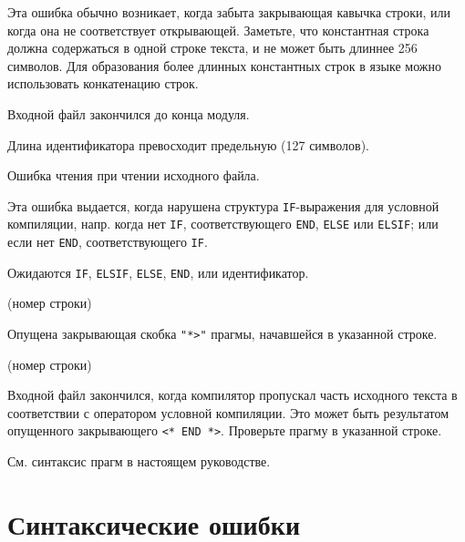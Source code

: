 
Эта ошибка обычно возникает, когда забыта закрывающая кавычка строки,
или когда она не соответствует открывающей. Заметьте, что 
константная строка должна содержаться в одной строке текста, и
не может быть длиннее 256 символов.
Для образования более длинных константных строк в языке \mt{} можно 
использовать конкатенацию строк.


Входной файл закончился до конца модуля.


Длина идентификатора превосходит предельную (127 символов).


Ошибка чтения при чтении исходного файла.



Эта ошибка выдается, когда нарушена структура \verb'IF'-выражения 
для условной компиляции, напр. когда нет 
\verb'IF', соответствующего \verb'END', \verb'ELSE' или \verb'ELSIF';
или если нет \verb'END', соответствующего \verb'IF'.


Ожидаются \verb'IF', \verb'ELSIF', \verb'ELSE', \verb'END', или идентификатор.

(номер строки)

Опущена закрывающая скобка \verb'"*>"' прагмы, начавшейся
в указанной строке.

(номер строки)

Входной файл закончился, когда компилятор пропускал часть исходного текста 
в соответствии с оператором условной компиляции. Это может быть 
результатом опущенного закрывающего 
\verb'<* END *>'. Проверьте прагму в указанной строке.


См. синтаксис прагм в настоящем руководстве.

\section{Синтаксические ошибки}

